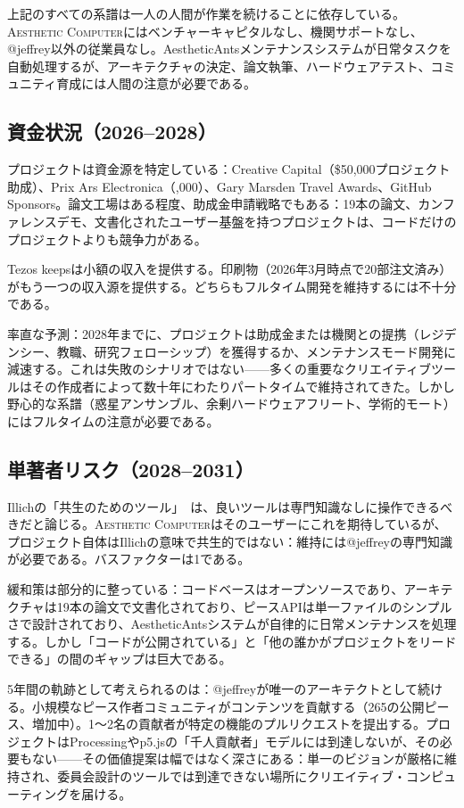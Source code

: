 \documentclass[10pt,letterpaper,twocolumn]{article}
\newcommand{\ac}{\textsc{Aesthetic Computer}}
\begin{document}
上記のすべての系譜は一人の人間が作業を続けることに依存している。\ac{}にはベンチャーキャピタルなし、機関サポートなし、@jeffrey以外の従業員なし。AestheticAntsメンテナンスシステムが日常タスクを自動処理するが、アーキテクチャの決定、論文執筆、ハードウェアテスト、コミュニティ育成には人間の注意が必要である。

\subsection{資金状況（2026--2028）}

プロジェクトは資金源を特定している：Creative Capital（\$50,000プロジェクト助成）、Prix Ars Electronica（,000）、Gary Marsden Travel Awards、GitHub Sponsors。論文工場はある程度、助成金申請戦略でもある：19本の論文、カンファレンスデモ、文書化されたユーザー基盤を持つプロジェクトは、コードだけのプロジェクトよりも競争力がある。

Tezos keepsは小額の収入を提供する。印刷物（2026年3月時点で20部注文済み）がもう一つの収入源を提供する。どちらもフルタイム開発を維持するには不十分である。

率直な予測：2028年までに、プロジェクトは助成金または機関との提携（レジデンシー、教職、研究フェローシップ）を獲得するか、メンテナンスモード開発に減速する。これは失敗のシナリオではない——多くの重要なクリエイティブツールはその作成者によって数十年にわたりパートタイムで維持されてきた。しかし野心的な系譜（惑星アンサンブル、余剰ハードウェアフリート、学術的モート）にはフルタイムの注意が必要である。

\subsection{単著者リスク（2028--2031）}

Illichの「共生のためのツール」~\citep{illich1973tools}は、良いツールは専門知識なしに操作できるべきだと論じる。\ac{}はそのユーザーにこれを期待しているが、プロジェクト自体はIllichの意味で共生的ではない：維持には@jeffreyの専門知識が必要である。バスファクターは1である。

緩和策は部分的に整っている：コードベースはオープンソースであり、アーキテクチャは19本の論文で文書化されており、ピースAPIは単一ファイルのシンプルさで設計されており、AestheticAntsシステムが自律的に日常メンテナンスを処理する。しかし「コードが公開されている」と「他の誰かがプロジェクトをリードできる」の間のギャップは巨大である。

5年間の軌跡として考えられるのは：@jeffreyが唯一のアーキテクトとして続ける。小規模なピース作者コミュニティがコンテンツを貢献する（265の公開ピース、増加中）。1〜2名の貢献者が特定の機能のプルリクエストを提出する。プロジェクトはProcessingやp5.jsの「千人貢献者」モデルには到達しないが、その必要もない——その価値提案は幅ではなく深さにある：単一のビジョンが厳格に維持され、委員会設計のツールでは到達できない場所にクリエイティブ・コンピューティングを届ける。
\end{document}
